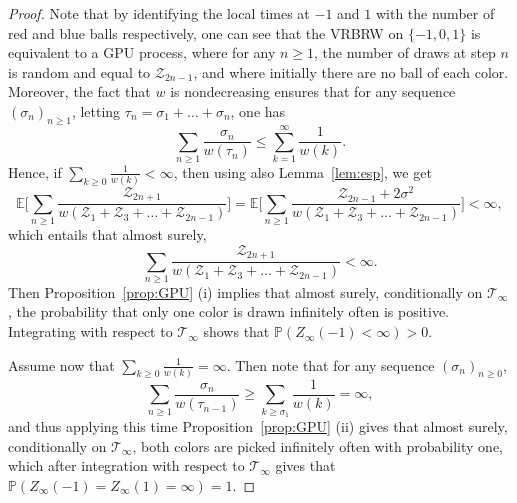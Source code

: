 \documentclass[11pt]{article}
\newcommand{\1}{{\text{\Large $\mathfrak 1$}}}
\begin{document}
\begin{proof}
Note that by identifying the local times at $-1$ and $1$ with the number of red and blue balls respectively, one can see that the VRBRW on $\{-1,0,1\}$ is equivalent to a GPU process, where for any $n\ge 1$, the number of draws at step $n$ is random and equal to  $\mathcal Z_{2n-1}$, and where initially there are no ball of each color.  Moreover, the fact that $w$ is nondecreasing ensures that for any sequence $(\sigma_n)_{n\ge 1}$, letting $\tau_n = \sigma_1+\dots + \sigma_n$, one has 
$$\sum_{n\ge 1}\frac{\sigma_n}{w(\tau_n)} \le \sum_{k=1}^\infty \frac 1{w(k)}. $$ 
Hence, if $\sum_{k\ge 0} \frac 1{w(k)}<\infty$, then using also Lemma~\ref{lem:esp}, we get 
$$\mathbb E\Big[ \sum_{n\ge 1}\frac{\mathcal Z_{2n+1}}{w(\mathcal Z_1+\mathcal Z_3+ \dots + \mathcal Z_{2n-1} )}\Big] =
\mathbb E\Big[ \sum_{n\ge 1}\frac{\mathcal Z_{2n-1}+2 \sigma^2}{w(\mathcal Z_1+\mathcal Z_3+ \dots + \mathcal Z_{2n-1} )}\Big]   <\infty,$$ 
which entails that almost surely, 
$$\sum_{n\ge 1}\frac{\mathcal Z_{2n+1}}{w(\mathcal Z_1+\mathcal Z_3+ \dots + \mathcal Z_{2n-1} )}<\infty. $$ 
Then Proposition~\ref{prop:GPU} (i) implies that almost surely, conditionally on $\mathcal T_\infty$, the probability that only one color is drawn infinitely often is positive. Integrating with respect to $\mathcal T_\infty$ shows that $\mathbb P(Z_\infty(-1)<\infty) >0$. 


Assume now that $\sum_{k\ge 0} \frac 1{w(k)}= \infty$. Then note that for any sequence $(\sigma_n)_{n\ge 0}$, 
$$\sum_{n\ge 1}\frac{\sigma_n}{w(\tau_{n-1})} \ge \sum_{k\ge \sigma_1} \frac 1{w(k)}  = \infty,$$ 
and thus applying this time Proposition~\ref{prop:GPU} (ii) gives that almost surely, conditionally on $\mathcal T_\infty$, both colors are picked infinitely often with probability one, which after integration with respect to $\mathcal T_\infty$ gives that $\mathbb P(Z_\infty(-1) = Z_\infty(1) = \infty) = 1$. 
\end{proof}
\end{document}
